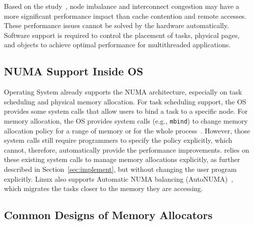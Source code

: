 


Based on the study~\cite{Blagodurov:2011:CNC:2002181.2002182}, node imbalance and interconnect congestion may have a more significant performance impact than cache contention and remote accesses. These performance issues cannot be solved by the hardware automatically. Software support is required to control the placement of tasks, physical pages, and objects to achieve optimal performance for multithreaded applications.

\subsection{NUMA Support Inside OS} 

Operating System already supports the NUMA architecture, especially on task scheduling and physical memory allocation. For task scheduling support, the OS provides some system calls that allow users to bind a task to a specific node. For memory allocation, the OS provides system calls (e.g., \texttt{mbind}) to change memory allocation policy for a range of memory or for the whole process~\cite{lameter2013numa, diener2015locality}. However, those system calls still require programmers to specify the policy explicitly, which cannot, therefore, automatically provide the performance improvements. \NM{} relies on these existing system calls to manage memory allocations explicitly, as further described in Section~\ref{sec:implement}, but without changing the user program explicitly. Linux also supports Automatic NUMA balancing (AutoNUMA)~\cite{AutoNUMA1}, which migrates the tasks closer to the memory they are accessing. 

\subsection{Common Designs of Memory Allocators}
\label{sec:commondesign}

